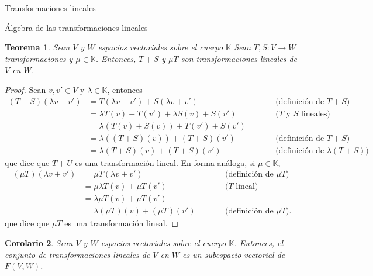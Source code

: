 \documentclass[a4paper,12pt,twoside,spanish,reqno]{amsbook}
\newtheorem{teorema}{Teorema}[section]
\newtheorem{corolario}[teorema]{Corolario}
\theoremstyle{definition}
\theoremstyle{remark}
\newcommand{\K}{\mathbb K}
\begin{document}
\begin{chapter}{Transformaciones lineales}
\begin{section}{Álgebra de las transformaciones lineales}
            \begin{teorema}
                Sean $V$ y $W$ espacios vectoriales sobre el cuerpo $\K$ Sean $T,S : V \to W$ transformaciones y $\mu \in \K$. Entonces, $T + S$ y $\mu T$ son transformaciones lineales de $V$ en $W$.
            \end{teorema}
            \begin{proof}
                Sean $v,v' \in V$ y $\lambda \in \K$, entonces
                \begin{equation*}
                \begin{array}{rlll}
                    (T + S)(\lambda v + v') &= T(\lambda v + v') + S(\lambda v + v')&\qquad&\text{(definición de $T+S$)} \\
                    &= \lambda T(v) + T(v') + \lambda S(v) + S(v')& &\text{($T$ y $S$ lineales)}\\
                    &= \lambda (T(v) +S(v)) + T(v') + S(v')&&\text{}\\
                    &= \lambda ((T+S)(v)) + (T + S) (v')& &\text{(definición de $T+S$)}\\
                    &= \lambda(T + S)(v) +(T + S) (v')&&\text{(definición de $\lambda(T + S)$)}.
                \end{array}
                \end{equation*}
                que dice que $T + U$ es una transformación lineal. En forma análoga, si $\mu \in \K$, 
                \begin{equation*}
                \begin{array}{rlll}
                (\mu T)(\lambda v + v') &= \mu T(\lambda v + v')&\qquad&\text{(definición de $\mu T$)} \\
                &= \mu \lambda T(v) + \mu T(v') &\qquad&\text{($T$ lineal)}\\
                &=  \lambda \mu T(v) + \mu T(v')&\qquad&\text{}\\
                &= \lambda (\mu T)(v) + (\mu T)(v') &\qquad&\text{(definición de $\mu T$)}.
                \end{array}
                \end{equation*}
                que dice que $\mu T$ es una transformación lineal.
            \end{proof}
            
        \begin{corolario}
            Sean $V$ y $W$ espacios vectoriales sobre el cuerpo $\K$. Entonces, el conjunto de transformaciones lineales de $V$ en $W$ es un subespacio vectorial  de $F(V,W)$. 
        \end{corolario} 	
            

\end{section}
\end{chapter}
\end{document}
